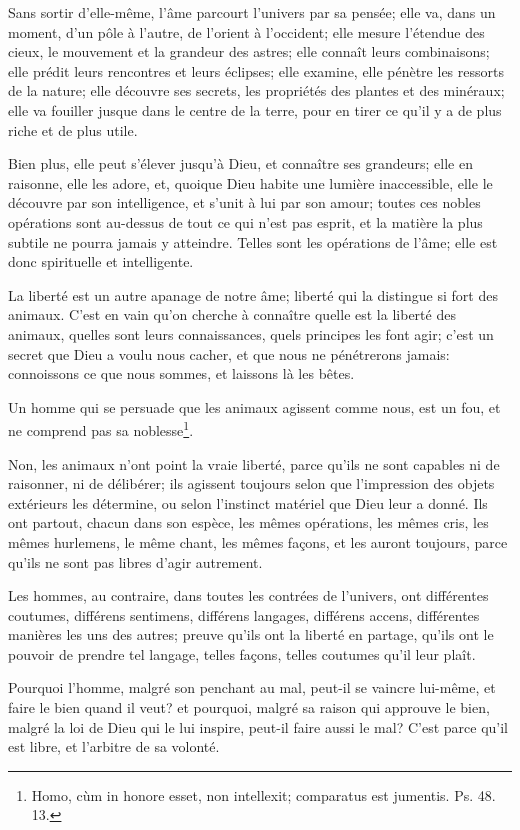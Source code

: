 \documentclass[instructions.tex]{subfiles}
\begin{document}
Sans sortir d’elle-même, l’âme parcourt l’univers par sa pensée; elle va, dans un moment, d’un pôle à l’autre, de l’orient à l’occident; elle mesure l’étendue des cieux, le mouvement et la grandeur des astres; elle connaît leurs combinaisons; elle prédit leurs rencontres et leurs éclipses; elle examine, elle pénètre les ressorts de la nature; elle découvre ses secrets, les propriétés des plantes et des minéraux; elle va fouiller jusque dans le centre de la terre, pour en tirer ce qu’il y a de plus riche et de plus utile.
 
Bien plus, elle peut s’élever jusqu’à Dieu, et connaître ses grandeurs; elle en raisonne, elle les adore, et, quoique Dieu habite une lumière inaccessible, elle le découvre par son intelligence, et s’unit à lui par son amour; toutes ces nobles opérations sont au-dessus de tout ce qui n’est pas esprit, et la matière la plus subtile ne pourra jamais y atteindre. Telles sont les opérations de l’âme; elle est donc spirituelle et intelligente.
 
\secundo La liberté est un autre apanage de notre âme; liberté qui la distingue si fort des animaux. C’est en vain qu’on cherche à connaître quelle est la liberté des animaux, quelles sont leurs connaissances, quels principes les font agir; c’est un secret que Dieu a voulu nous cacher, et que nous ne pénétrerons jamais: connoissons ce que nous sommes, et laissons là les bêtes.
 
Un homme qui se persuade que les animaux agissent comme nous, est un fou, et ne comprend pas sa noblesse\footnote{Homo, cùm in honore esset, non intellexit; comparatus est jumentis. Ps. 48. 13.}.
 
Non, les animaux n’ont point la vraie liberté, parce qu’ils ne sont capables ni de raisonner, ni de délibérer; ils agissent toujours selon que l’impression des objets extérieurs les détermine, ou selon l’instinct matériel que Dieu leur a donné. Ils ont partout, chacun dans son espèce, les mêmes opérations, les mêmes cris, les mêmes hurlemens, le même chant, les mêmes façons, et les auront toujours, parce qu’ils ne sont pas libres d’agir autrement.
 
Les hommes, au contraire, dans toutes les contrées de l’univers, ont différentes coutumes, différens sentimens, différens langages, différens accens, différentes manières les uns des autres; preuve qu’ils ont la liberté en partage, qu’ils ont le pouvoir de prendre tel langage, telles façons, telles coutumes qu’il leur plaît.
 
Pourquoi l’homme, malgré son penchant au mal, peut-il se vaincre lui-même, et faire le bien quand il veut? et pourquoi, malgré sa raison qui approuve le bien, malgré la loi de Dieu qui le lui inspire, peut-il faire aussi le mal? C’est parce qu’il est libre, et l’arbitre de sa volonté.
 
\end{document}
